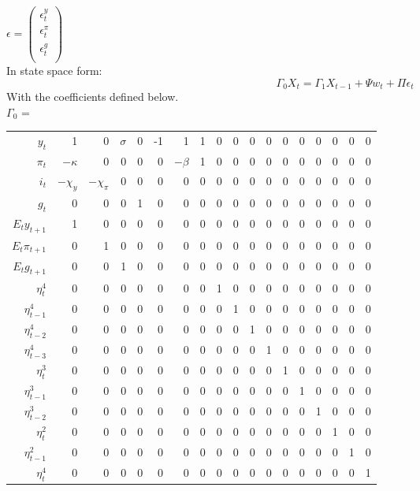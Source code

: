 \documentclass[]{article}
\begin{document}
$ \epsilon = 
\begin{pmatrix}
\epsilon_t^y \\
\epsilon_t^{\pi} \\
\epsilon_t^{g} \\
\end{pmatrix} $ \\
In state space form:
\[
\Gamma_0 X_t = \Gamma_1 X_{t-1} + \Psi w_t + \Pi \epsilon_t
\]
With the coefficients defined below. \\
$ \Gamma_0 $ = 
\begin{tabular}{r|rrrrrrrrrrrrrrrrr}
$ y_t $ & 1 & 0 & $ \sigma $ & 0 & -1 & 1 & 1 & 0 & 0 & 0 & 0 & 0 & 0 & 0 & 0 & 0 & 0 \\
$  \pi_t $ &$ -\kappa $ & 0 & 0 & 0 & 0 & $ -\beta $ & 1 & 0 & 0 & 0 & 0 & 0 & 0 & 0 & 0 & 0 & 0 \\
$ i_t $ & $ -\chi_y  $ & $ -\chi_{\pi} $ & 0 & 0 & 0 & 0 & 0 & 0 & 0 & 0 & 0 & 0 & 0 & 0 & 0 & 0 & 0 \\
$ g_t $ & 0 & 0 & 0 & 1 & 0 & 0 & 0 & 0 & 0 & 0 & 0 & 0 & 0 & 0 & 0 & 0 & 0 \\
$ E_ty_{t+1} $ & 1 & 0 & 0 & 0 & 0 & 0 & 0 & 0 & 0 & 0 & 0 & 0 & 0 & 0 & 0 & 0 & 0 \\
$ E_t\pi_{t+1}  $ & 0 & 1 & 0 & 0 & 0 & 0 & 0 & 0 & 0 & 0 & 0 & 0 & 0 & 0 & 0 & 0 & 0 \\
$ E_t g_{t+1} $ & 0 & 0 & 1 & 0 & 0 & 0 & 0 & 0 & 0 & 0 & 0 & 0 & 0 & 0 & 0 & 0 & 0 \\
$ \eta_t^4 $     & 0 & 0 & 0 & 0 & 0 & 0 & 0 & 1 & 0 & 0 & 0 & 0 & 0 & 0 & 0 & 0 & 0 \\
$ \eta_{t-1}^4 $ & 0 & 0 & 0 & 0 & 0 & 0 & 0 & 0 & 1 & 0 & 0 & 0 & 0 & 0 & 0 & 0 & 0 \\
$ \eta_{t-2}^4 $ & 0 & 0 & 0 & 0 & 0 & 0 & 0 & 0 & 0 & 1 & 0 & 0 & 0 & 0 & 0 & 0 & 0 \\
$ \eta_{t-3}^4 $ & 0 & 0 & 0 & 0 & 0 & 0 & 0 & 0 & 0 & 0 & 1 & 0 & 0 & 0 & 0 & 0 & 0 \\
$ \eta_{t}^3 $   & 0 & 0 & 0 & 0 & 0 & 0 & 0 & 0 & 0 & 0 & 0 & 1 & 0 & 0 & 0 & 0 & 0 \\
$ \eta_{t-1}^3 $ & 0 & 0 & 0 & 0 & 0 & 0 & 0 & 0 & 0 & 0 & 0 & 0 & 1 & 0 & 0 & 0 & 0 \\
$ \eta_{t-2}^3 $ & 0 & 0 & 0 & 0 & 0 & 0 & 0 & 0 & 0 & 0 & 0 & 0 & 0 & 1 & 0 & 0 & 0 \\
$ \eta_{t}^2 $   & 0 & 0 & 0 & 0 & 0 & 0 & 0 & 0 & 0 & 0 & 0 & 0 & 0 & 0 & 1 & 0 & 0 \\
$ \eta_{t-1}^2 $ & 0 & 0 & 0 & 0 & 0 & 0 & 0 & 0 & 0 & 0 & 0 & 0 & 0 & 0 & 0 & 1 & 0 \\
$ \eta_{t}^4 $   & 0 & 0 & 0 & 0 & 0 & 0 & 0 & 0 & 0 & 0 & 0 & 0 & 0 & 0 & 0 & 0 & 1 \\
\end{tabular}
\end{document}
